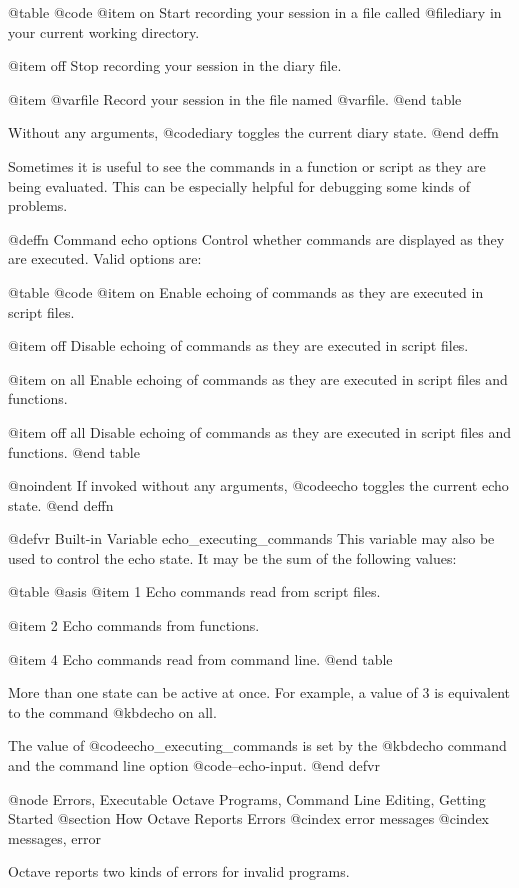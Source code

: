 @table @code
@item on
Start recording your session in a file called @file{diary} in your
current working directory.

@item off
Stop recording your session in the diary file.

@item @var{file}
Record your session in the file named @var{file}.
@end table

Without any arguments, @code{diary} toggles the current diary state.
@end deffn

Sometimes it is useful to see the commands in a function or script as
they are being evaluated.  This can be especially helpful for debugging
some kinds of problems.

@deffn {Command} echo options
Control whether commands are displayed as they are executed.  Valid
options are:

@table @code
@item on
Enable echoing of commands as they are executed in script files.

@item off
Disable echoing of commands as they are executed in script files.

@item on all
Enable echoing of commands as they are executed in script files and
functions.

@item off all
Disable echoing of commands as they are executed in script files and
functions.
@end table

@noindent
If invoked without any arguments, @code{echo} toggles the current echo
state.
@end deffn

@defvr {Built-in Variable} echo_executing_commands
This variable may also be used to control the echo state.  It may be
the sum of the following values:

@table @asis
@item 1
Echo commands read from script files.

@item 2
Echo commands from functions.

@item 4
Echo commands read from command line.
@end table

More than one state can be active at once.  For example, a value of 3 is
equivalent to the command @kbd{echo on all}.

The value of @code{echo_executing_commands} is set by the @kbd{echo}
command and the command line option @code{--echo-input}.
@end defvr

@node Errors, Executable Octave Programs, Command Line Editing, Getting Started
@section How Octave Reports Errors
@cindex error messages
@cindex messages, error

Octave reports two kinds of errors for invalid programs.

